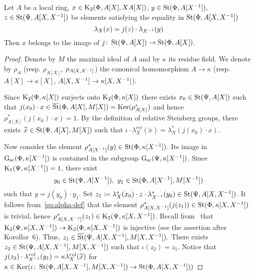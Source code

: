 \begin{lemma} \label{lem:horrocks--ingredient}
Let $A$ be a local ring, $x \in \operatorname{K}_2(\Phi, A[X], XA[X])$, $y \in \operatorname{St}(\Phi, A[X^{-1}]),$ $z \in \operatorname{St}(\Psi, A[X, X^{-1}])$ be elements satisfying the equality in $\operatorname{St}(\Phi, A[X, X^{-1}])$
\begin{equation} \label{eq:alpha-def}\lambda_X(x) = j(z) \cdot \lambda_{X^{-1}}(y) \end{equation}
Then $x$ belongs to the image of $j\colon \operatorname{St}(\Psi, A[X]) \to \operatorname{St}(\Phi, A[X])$.
\end{lemma}
\begin{proof}
    Denote by $M$ the maximal ideal of $A$ and by $\kappa$ its residue field.
    We denote by $\rho_{A}$ (resp. $\rho_{A[X]}$, $\rho_{A[X, X^{-1}]}$) the canonical homomorphism $A \to \kappa$ (resp. $A[X] \to \kappa[X]$, $A[X, X^{-1}] \to \kappa[X, X^{-1}]$).

    Since $\operatorname{K}_2(\Psi, \kappa[X])$ surjects onto $\operatorname{K}_2(\Phi, \kappa[X])$ there exists $x_0 \in \operatorname{St}(\Psi, A[X])$ such that $j(x_0) \cdot x \in \overline{\operatorname{St}}(\Phi, A[X], M[X]) = \operatorname{Ker}(\rho^*_{A[X]})$ and
    hence $\rho_{A[X]}^*(j(x_0) \cdot x) = 1$.
    By the definition of relative Steinberg groups, there exists $\widetilde{x} \in \operatorname{St}(\Phi, A[X], M[X])$ such that
    $\iota \cdot \lambda_X^{rel}(\widetilde{x}) = \lambda_X^* (j(x_0) \cdot x)$. %

    Now consider the element $\rho^*_{A[X^{-1}]}(y) \in \operatorname{St}(\Phi, \kappa[X^{-1}])$.
    Its image in $\operatorname{G}_\mathrm{sc}(\Phi, \kappa[X^{-1}])$ is contained in the subgroup $\operatorname{G}_\mathrm{sc}(\Psi, \kappa[X^{-1}])$.
    Since $\operatorname{K}_1(\Psi, \kappa[X^{-1}]) = 1$, there exist
    \[y_0 \in \operatorname{St}(\Psi, A[X^{-1}]),\ y_1 \in \operatorname{St}(\Phi, A[X^{-1}], M[X^{-1}])\] such that $y = j(y_0) \cdot y_1$.
    Set $z_1 \coloneqq \lambda^*_X(x_0) \cdot z \cdot \lambda^*_{X^{-1}}(y_0) \in \operatorname{St}(\Psi, A[X, X^{-1}])$.
    It follows from~\eqref{eq:alpha-def} that the element $\rho_{A[X, X^{-1}]}^*(j(z_1)) \in \operatorname{St}(\Phi, \kappa[X, X^{-1}])$ is trivial, hence $\rho^*_{A[X, X^{-1}]}(z_1) \in \operatorname{K}_2(\Psi, \kappa[X, X^{-1}])$.
    Recall from~\cite{Hur77} that $\operatorname{K}_2(\Psi, \kappa[X, X^{-1}]) \to \operatorname{K}_2(\Phi, \kappa[X, X^{-1}])$ is injective (see the assertion after Korollar~6).
    Thus, $z_1 \in \overline{\operatorname{St}}(\Psi, A[X, X^{-1}], M[X, X^{-1}]).$
    There exists $z_2 \in \operatorname{St}(\Psi, A[X, X^{-1}], M[X, X^{-1}])$ such that $\iota (z_2) = z_1$.
    Notice that $j(z_2) \cdot \lambda_{X^{-1}}^{rel}(y_1) = \kappa \lambda_X^{rel}(\widetilde{x})$ for $\kappa \in \operatorname{Ker}(\iota\colon \operatorname{St}(\Phi, A[X, X^{-1}], M[X, X^{-1}]) \to \operatorname{St}(\Phi, A[X, X^{-1}]))$


\end{proof}
